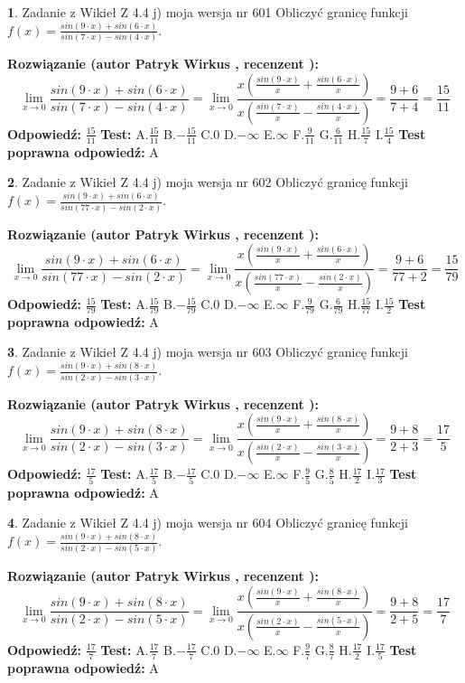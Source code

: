 \documentclass[12pt, a4paper]{article}
\theoremstyle{definition} %
\newtheorem{zad}{}
\newcommand{\zadStart}[1]{\begin{zad}#1\newline}
\newcommand{\zadStop}{\end{zad}}
\newcommand{\rozwStart}[2]{\noindent \textbf{Rozwiązanie (autor #1 , recenzent #2): }\newline}
\newcommand{\rozwStop}{\newline}
\newcommand{\odpStart}{\noindent \textbf{Odpowiedź:}\newline}
\newcommand{\odpStop}{\newline}
\newcommand{\testStart}{\noindent \textbf{Test:}\newline}
\newcommand{\testStop}{\newline}
\newcommand{\kluczStart}{\noindent \textbf{Test poprawna odpowiedź:}\newline}
\newcommand{\kluczStop}{\newline}
\begin{document}
\zadStart{Zadanie z Wikieł Z 4.4 j) moja wersja nr 601}
Obliczyć granicę funkcji $f(x)=\frac{sin(9\cdot x) +sin(6\cdot x)}{sin(7\cdot x) -sin(4\cdot x)}$.
\zadStop
\rozwStart{Patryk Wirkus}{}
$$\lim\limits_{x\to 0}\frac{sin(9\cdot x) +sin(6\cdot x)}{sin(7\cdot x) -sin(4\cdot x)}=\lim\limits_{x\to 0}\frac{x(\frac{sin(9\cdot x)}{x}+\frac{sin(6\cdot x)}{x})}{x(\frac{sin(7\cdot x)}{x}-\frac{sin(4\cdot x)}{x})}=\frac{9+6}{7+4} = \frac{15}{11}$$
\rozwStop
\odpStart
$\frac{15}{11}$
\odpStop
\testStart
A.$\frac{15}{11}$
B.$-\frac{15}{11}$
C.$0$
D.$-\infty$
E.$\infty$
F.$\frac{9}{11}$
G.$\frac{6}{11}$
H.$\frac{15}{7}$
I.$\frac{15}{4}$
\testStop
\kluczStart
A
\kluczStop



\zadStart{Zadanie z Wikieł Z 4.4 j) moja wersja nr 602}
Obliczyć granicę funkcji $f(x)=\frac{sin(9\cdot x) +sin(6\cdot x)}{sin(77\cdot x) -sin(2\cdot x)}$.
\zadStop
\rozwStart{Patryk Wirkus}{}
$$\lim\limits_{x\to 0}\frac{sin(9\cdot x) +sin(6\cdot x)}{sin(77\cdot x) -sin(2\cdot x)}=\lim\limits_{x\to 0}\frac{x(\frac{sin(9\cdot x)}{x}+\frac{sin(6\cdot x)}{x})}{x(\frac{sin(77\cdot x)}{x}-\frac{sin(2\cdot x)}{x})}=\frac{9+6}{77+2} = \frac{15}{79}$$
\rozwStop
\odpStart
$\frac{15}{79}$
\odpStop
\testStart
A.$\frac{15}{79}$
B.$-\frac{15}{79}$
C.$0$
D.$-\infty$
E.$\infty$
F.$\frac{9}{79}$
G.$\frac{6}{79}$
H.$\frac{15}{77}$
I.$\frac{15}{2}$
\testStop
\kluczStart
A
\kluczStop



\zadStart{Zadanie z Wikieł Z 4.4 j) moja wersja nr 603}
Obliczyć granicę funkcji $f(x)=\frac{sin(9\cdot x) +sin(8\cdot x)}{sin(2\cdot x) -sin(3\cdot x)}$.
\zadStop
\rozwStart{Patryk Wirkus}{}
$$\lim\limits_{x\to 0}\frac{sin(9\cdot x) +sin(8\cdot x)}{sin(2\cdot x) -sin(3\cdot x)}=\lim\limits_{x\to 0}\frac{x(\frac{sin(9\cdot x)}{x}+\frac{sin(8\cdot x)}{x})}{x(\frac{sin(2\cdot x)}{x}-\frac{sin(3\cdot x)}{x})}=\frac{9+8}{2+3} = \frac{17}{5}$$
\rozwStop
\odpStart
$\frac{17}{5}$
\odpStop
\testStart
A.$\frac{17}{5}$
B.$-\frac{17}{5}$
C.$0$
D.$-\infty$
E.$\infty$
F.$\frac{9}{5}$
G.$\frac{8}{5}$
H.$\frac{17}{2}$
I.$\frac{17}{3}$
\testStop
\kluczStart
A
\kluczStop



\zadStart{Zadanie z Wikieł Z 4.4 j) moja wersja nr 604}
Obliczyć granicę funkcji $f(x)=\frac{sin(9\cdot x) +sin(8\cdot x)}{sin(2\cdot x) -sin(5\cdot x)}$.
\zadStop
\rozwStart{Patryk Wirkus}{}
$$\lim\limits_{x\to 0}\frac{sin(9\cdot x) +sin(8\cdot x)}{sin(2\cdot x) -sin(5\cdot x)}=\lim\limits_{x\to 0}\frac{x(\frac{sin(9\cdot x)}{x}+\frac{sin(8\cdot x)}{x})}{x(\frac{sin(2\cdot x)}{x}-\frac{sin(5\cdot x)}{x})}=\frac{9+8}{2+5} = \frac{17}{7}$$
\rozwStop
\odpStart
$\frac{17}{7}$
\odpStop
\testStart
A.$\frac{17}{7}$
B.$-\frac{17}{7}$
C.$0$
D.$-\infty$
E.$\infty$
F.$\frac{9}{7}$
G.$\frac{8}{7}$
H.$\frac{17}{2}$
I.$\frac{17}{5}$
\testStop
\kluczStart
A
\kluczStop
\end{document}

